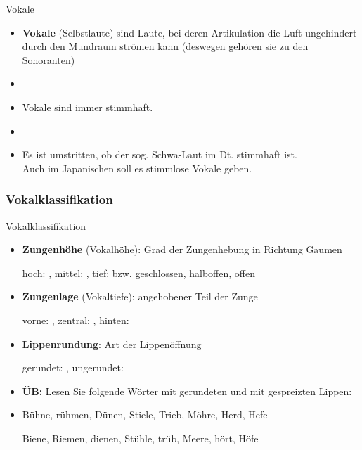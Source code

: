 \begin{frame}{Vokale}

	\begin{itemize}
		\item \textbf{Vokale} (Selbstlaute) sind Laute, bei deren Artikulation die Luft ungehindert durch den Mundraum strömen kann (deswegen gehören sie zu den Sonoranten)
		\item[]
		\item Vokale sind \idR immer stimmhaft.
		\item[]
		\item Es ist umstritten, ob der sog. Schwa-Laut im Dt. \textipa{[ @ ]} stimmhaft
                  ist.\\
                  Auch im Japanischen soll es stimmlose Vokale geben.
	\end{itemize}
	
\end{frame}


%
\subsubsection{Vokalklassifikation}
%

\begin{frame}{Vokalklassifikation}

	\begin{itemize}
		\item \textbf{Zungenhöhe} (Vokalhöhe): Grad der Zungenhebung in Richtung Gaumen

		\ea hoch: \textipa{[ i: ]}, mittel: \textipa{[ o: ]}, tief: \textipa{[ a: ]} bzw. geschlossen, halboffen, offen
		\z

		\item \textbf{Zungenlage} (Vokaltiefe): angehobener Teil der Zunge

		\ea vorne: \textipa{[ i: ]}, zentral: \textipa{[ a: ]}, hinten: \textipa{[ u: ]}
		\z

		\item \textbf{Lippenrundung}: Art der Lippenöffnung

		\ea gerundet: \textipa{[ o: ]}, ungerundet: \textipa{[ i: ]}
		\z

		\bigskip
                
		\item\textbf{ÜB:} Lesen Sie folgende Wörter mit gerundeten und mit gespreizten Lippen:
		\item[] Bühne, rühmen, Dünen, Stiele, Trieb, Möhre, Herd, Hefe
                  \pause
                  
                        Biene, Riemen, dienen, Stühle, trüb, Meere, hört, Höfe
	\end{itemize}
	
\end{frame}


